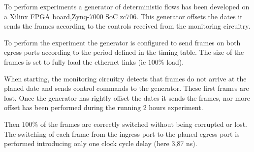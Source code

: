 To perform experiments a generator of deterministic flows has been developed on a Xilinx FPGA board,Zynq-7000 SoC zc706. This generator offsets the dates it sends the frames according to the controls received from the monitoring circuitry.

To perform the experiment the generator is configured to send frames on both egress ports according to the period defined in the timing table. The size of the frames is set to fully load the ethernet links (ie $100\%$ load).

When starting, the monitoring circuitry detects that frames do not arrive at the planed date and sends control commands to the generator. These first frames are lost. Once the generator has rightly offset the dates it sends the frames, nor more offset has been performed during the running 2 hours experiment.

Then $100\%$ of the frames are correctly switched without being corrupted or lost. The switching of each frame from the ingress port to the planed egress port is performed introducing only one clock cycle delay (here 3,87 ns).
